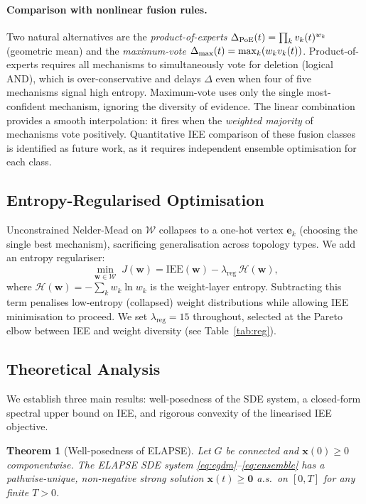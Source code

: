 \documentclass[review,12pt]{elsarticle}
\newcommand{\bfx}{\mathbf{x}}
\newcommand{\bfw}{\mathbf{w}}
\newcommand{\IEE}{\mathrm{IEE}}
\newtheorem{theorem}{Theorem}
\begin{document}
\paragraph{Comparison with nonlinear fusion rules.}
Two natural alternatives are the \emph{product-of-experts}
$\Delta_{\rm PoE}(t) = \prod_k v_k(t)^{w_k}$
(geometric mean) and the \emph{maximum-vote}
$\Delta_{\rm max}(t) = \max_k (w_k v_k(t))$.
Product-of-experts requires all mechanisms to simultaneously vote for deletion
(logical AND), which is over-conservative and delays $\Delta$ even when four
of five mechanisms signal high entropy.  Maximum-vote uses only the single
most-confident mechanism, ignoring the diversity of evidence.  The linear
combination provides a smooth interpolation: it fires when the
\emph{weighted majority} of mechanisms vote positively.
Quantitative IEE comparison of these fusion classes is identified as future work,
as it requires independent ensemble optimisation for each class.

\subsection{Entropy-Regularised Optimisation}

Unconstrained Nelder-Mead on $\mathcal{W}$ collapses to a one-hot vertex
$\mathbf{e}_k$ (choosing the single best mechanism), sacrificing
generalisation across topology types. We add an entropy regulariser:
\begin{equation}
  \min_{\bfw \in \mathcal{W}}\; J(\bfw)
    = \IEE(\bfw) - \lambda_{\mathrm{reg}}\,\mathcal{H}(\bfw),
  \label{eq:objective}
\end{equation}
where $\mathcal{H}(\bfw) = -\sum_k w_k \ln w_k$ is the weight-layer
entropy. Subtracting this term penalises low-entropy (collapsed) weight
distributions while allowing IEE minimisation to proceed. We set
$\lambda_{\mathrm{reg}} = 15$ throughout, selected at the Pareto elbow
between IEE and weight diversity (see Table~\ref{tab:reg}).

\subsection{Theoretical Analysis}
\label{sec:theory}

We establish three main results: well-posedness of the SDE system, a
closed-form spectral upper bound on IEE, and rigorous convexity of the
linearised IEE objective.

\begin{theorem}[Well-posedness of ELAPSE]
\label{thm:wellposed}
Let $G$ be connected and $\bfx(0) \geq 0$ componentwise.
The ELAPSE SDE system \eqref{eq:egdm}--\eqref{eq:ensemble} has a
pathwise-unique, non-negative strong solution $\bfx(t) \geq \mathbf{0}$
a.s.\ on $[0,T]$ for any finite $T > 0$.
\end{theorem}
\end{document}
